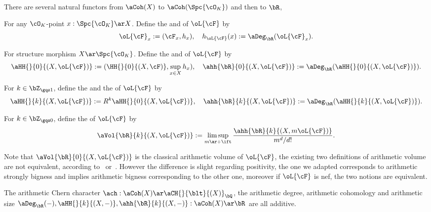 \documentclass[a4paper, twoside]{article}
\begin{document}
\begin{dfn}
	There are several natural functors from $\aCoh(X)$ to $\aCoh(\Spc{\cO_{K}})$ and then to $\bR$,
	\begin{itm}
		\item For any $\cO_{K}$-point $x:\Spc{\cO_{K}}\ar X$. Define the  and  of $\oL{\cF}$ by
		\[
			\oL{\cF}_{x}:=(\cF_{x},h_{x}),\quad h_{\oL{\cF}}(x):=\aDeg_{\bR}(\oL{\cF}_{x}).
		\]
		\item For structure morphism $X\ar\Spc{\cO_{K}}$. Define the  and  of $\oL{\cF}$ by
		\[
			\aHH{}{0}{(X,\oL{\cF})}:=(\HH{}{0}{(X,\cF)},\sup_{x\in X}h_{x}),\quad\ahh{\bR}{0}{(X,\oL{\cF})}:=\aDeg_{\bR}(\aHH{}{0}{(X,\oL{\cF})}).
		\]
		\item For $k\in\bZ_{\gqs1}$, define the  and the  of $\oL{\cF}$ by
		\[
			\aHH{}{k}{(X,\oL{\cF})}:=R^{k}\aHH{}{0}{(X,\oL{\cF})},\quad \ahh{\bR}{k}{(X,\oL{\cF})}:=\aDeg_{\bR}(\aHH{}{k}{(X,\oL{\cF})}).
		\]
		\item For $k\in\bZ_{\gqs0}$, define the  of $\oL{\cF}$ by
		\[
			\aVol{\bR}{k}{(X,\oL{\cF})}:=\limsup_{m\ar+\ift}\frac{\ahh{\bR}{k}{(X,m\oL{\cF})}}{m^{d}/d!}.
		\]
	\end{itm}

\end{dfn}

\begin{rmk}
	Note that $\aVol{\bR}{0}{(X,\oL{\cF})}$ is the classical arithmetic volume of $\oL{\cF}$, the existing two definitions of arithmetic volume are not equivalent, according to~\cite[Page~368]{Chen2011} or~\cite[Page~613]{Yuan2008Big}. However the difference is slight regarding positivity, the one we adapted corresponds to arithmetic strongly bigness and implies arithmetic bigness corresponding to the other one, moreover if $\oL{\cF}$ is nef, the two notions are equivalent.
\end{rmk}

\begin{thm}
	The arithmetic Chern character $\ach:\aCoh(X)\ar\aCH{}{\blt}{(X)}_{\bQ}$, the arithmetic degree, arithmetic cohomology and arithmetic size $\aDeg_{\bR}(-),\aHH{}{k}{(X,-)},\ahh{\bR}{k}{(X,-)}:\aCoh(X)\ar\bR$ are all additive.
\end{thm}
\end{document}

